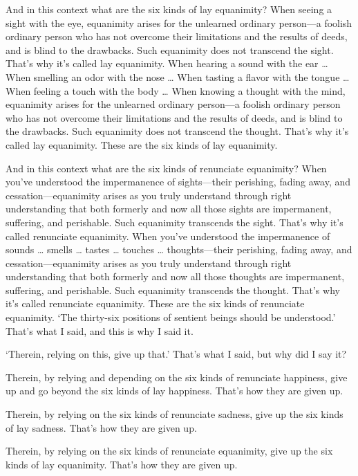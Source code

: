 \documentclass[12pt,openany]{book}%
\begin{document}
And in this context what are the six kinds of lay equanimity? When seeing a sight with the eye, equanimity arises for the unlearned ordinary person—a foolish ordinary person who has not overcome their limitations and the results of deeds, and is blind to the drawbacks. Such equanimity does not transcend the sight. That’s why it’s called lay equanimity. When hearing a sound with the ear … When smelling an odor with the nose … When tasting a flavor with the tongue … When feeling a touch with the body … When knowing a thought with the mind, equanimity arises for the unlearned ordinary person—a foolish ordinary person who has not overcome their limitations and the results of deeds, and is blind to the drawbacks. Such equanimity does not transcend the thought. That’s why it’s called lay equanimity. These are the six kinds of lay equanimity. 

And in this context what are the six kinds of renunciate equanimity? When you’ve understood the impermanence of sights—their perishing, fading away, and cessation—equanimity arises as you truly understand through right understanding that both formerly and now all those sights are impermanent, suffering, and perishable. Such equanimity transcends the sight. That’s why it’s called renunciate equanimity. When you’ve understood the impermanence of sounds … smells … tastes … touches … thoughts—their perishing, fading away, and cessation—equanimity arises as you truly understand through right understanding that both formerly and now all those thoughts are impermanent, suffering, and perishable. Such equanimity transcends the thought. That’s why it’s called renunciate equanimity. These are the six kinds of renunciate equanimity. ‘The thirty-six positions of sentient beings should be understood.’ That’s what I said, and this is why I said it. 

‘Therein, relying on this, give up that.’ That’s what I said, but why did I say it? 

Therein, by relying and depending on the six kinds of renunciate happiness, give up and go beyond the six kinds of lay happiness. That’s how they are given up. 

Therein, by relying on the six kinds of renunciate sadness, give up the six kinds of lay sadness. That’s how they are given up. 

Therein, by relying on the six kinds of renunciate equanimity, give up the six kinds of lay equanimity. That’s how they are given up. 
\end{document}

